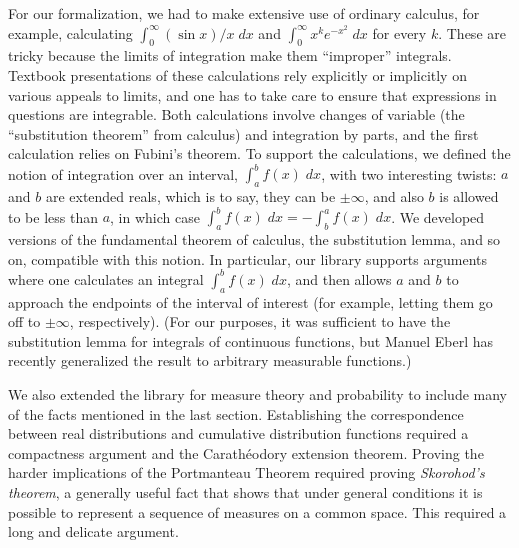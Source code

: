\documentclass{article}
\begin{document}
For our formalization, we had to make extensive use of ordinary calculus, for example, calculating $\int_0^\infty (\sin x) / x \; dx$ and $\int_0^\infty x^k e^{-x^2} \; dx$ for every $k$. These are tricky because the limits of integration make them ``improper'' integrals. Textbook presentations of these calculations rely explicitly or implicitly on various appeals to limits, and one has to take care to ensure that expressions in questions are integrable. Both calculations involve changes of variable (the ``substitution theorem'' from calculus) and integration by parts, and the first calculation relies on Fubini's theorem. To support the calculations, we defined the notion of integration over an interval, $\int_a^b f(x) \; dx$, with two interesting twists: $a$ and $b$ are extended reals, which is to say, they can be $\pm \infty$, and also $b$ is allowed to be less than $a$, in which case $\int_a^b f(x) \; dx = - \int_b^a f(x) \; dx$. We developed versions of the fundamental theorem of calculus, the substitution lemma, and so on, compatible with this notion. In particular, our library supports arguments where one calculates an integral $\int_a^b f(x) \; dx$, and then allows $a$ and $b$ to approach the endpoints of the interval of interest (for example, letting them go off to $\pm \infty$, respectively). (For our purposes, it was sufficient to have the substitution lemma for integrals of continuous functions, but Manuel Eberl has recently generalized the result to arbitrary measurable functions.)

We also extended the library for measure theory and probability to include many of the facts mentioned in the last section. Establishing the correspondence between real distributions and cumulative distribution functions 
required a compactness argument and the Carath\'eodory extension theorem. Proving the harder implications of the Portmanteau Theorem required proving \emph{Skorohod's theorem}, a generally useful fact that shows that under general conditions it is possible to represent a sequence of measures on a common space. This required a long and delicate argument.
\end{document}
